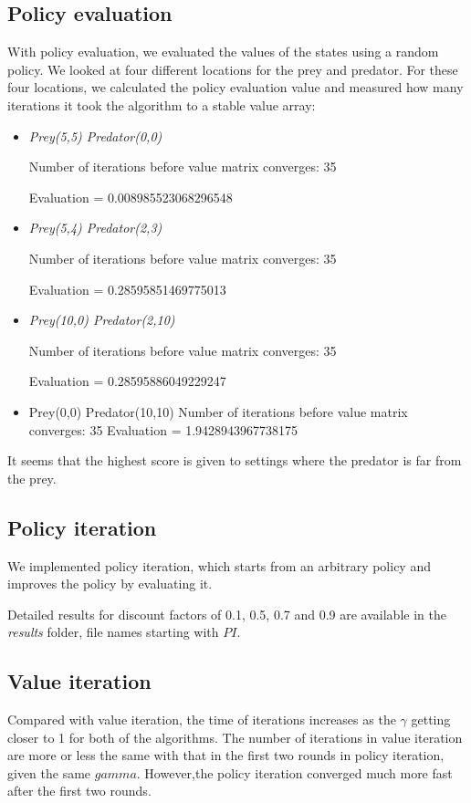 \documentclass{article}
\begin{document}
\subsection{Policy evaluation}
With policy evaluation, we evaluated the values of the states using a random policy. We looked at four different locations for the prey and predator. For these four locations, we calculated the policy evaluation value and measured how many iterations it took the algorithm to a stable value array:

\begin{itemize}
\item \emph{Prey(5,5) Predator(0,0)}

Number of iterations before value matrix converges: 35

Evaluation = 0.008985523068296548

\item \emph{Prey(5,4) Predator(2,3)}

Number of iterations before value matrix converges: 35

Evaluation = 0.28595851469775013

\item \emph{Prey(10,0) Predator(2,10)}

Number of iterations before value matrix converges: 35

Evaluation = 0.28595886049229247

\item Prey(0,0) Predator(10,10)
Number of iterations before value matrix converges: 35
Evaluation = 1.9428943967738175
\end{itemize}

It seems that the highest score is given to settings where the predator is far from the prey.
\subsection{Policy iteration}
We implemented policy iteration, which starts from an arbitrary policy and improves the policy by evaluating it.

Detailed results for discount factors of 0.1, 0.5, 0.7 and 0.9 are available in the \emph{results} folder, file names starting with $PI$.
\subsection{Value iteration}
Compared with value iteration, the time of iterations increases as the $\gamma$ getting closer to 1 for both of the algorithms. The number of iterations in value iteration are more or less the same with that in the first two rounds in policy iteration, given the same $gamma$. However,the policy iteration converged much more fast after the first two rounds.
\end{document}
